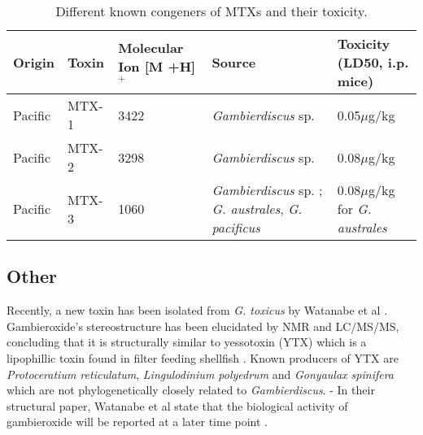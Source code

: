 \documentclass[12pt]{article}
\begin{document}

\begin{table}
\caption{Different known congeners of MTXs and their toxicity.}
\begin{tabular}{ |  p{2cm} | p{2cm} | p{3cm} | p{3cm} | p{4cm} | }
\hline
\textbf{Origin} & \textbf{Toxin} & \textbf{Molecular Ion [M +H]$^{+}$} & \textbf{Source} & \textbf{Toxicity (LD50, i.p. mice)} \\
\hline
 Pacific & MTX-1 & 3422 \cite{holmes1994purification,murata1993structure} & \emph{Gambierdiscus} sp. \cite{holmes1994purification} & 0.05$\mu$g/kg \cite{murata1993structure}\\
\hline
 Pacific & MTX-2 & 3298 \cite{holmes1994purification} & \emph{Gambierdiscus} sp. \cite{holmes1994purification} & 0.08$\mu$g/kg \cite{holmes1994purification}\\
\hline
 Pacific & MTX-3 & 1060   \cite{holmes1994purification} & \emph{Gambierdiscus} sp. \cite{holmes1994purification}; \emph{G. australes}, \emph{G. pacificus} \cite{rhodes2014production} &  0.08$\mu$g/kg for \emph{G. australes}  \cite{rhodes2014production} \\
\hline
\end{tabular}
\end{table}
\FloatBarrier
\subsection{Other}
Recently, a new toxin has been isolated from \emph{G. toxicus} by Watanabe et al \cite{watanabe2013gambieroxide}. Gambieroxide's stereostructure has been elucidated by NMR and LC/MS/MS, concluding that it is structurally similar to yessotoxin (YTX) which is a lipophillic toxin found in filter feeding shellfish  \cite{tubaro2010yessotoxins}. Known producers of YTX are \emph{Protoceratium reticulatum}, \emph{Lingulodinium polyedrum} and \emph{Gonyaulax spinifera} \cite{tubaro2010yessotoxins} which are not  phylogenetically closely related to \emph{Gambierdiscus}.
- In their structural paper, Watanabe et al state that the biological activity of gambieroxide will be reported at a later time point \cite{watanabe2013gambieroxide}.
\end{document}
